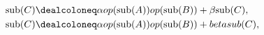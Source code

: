 \documentclass{article}
\begin{document}
\begin{align*} \mathrm{sub}(C) &\dealcoloneq \alpha op(\mathrm{sub}(A))op(\mathrm{sub}(B)) + \beta \mathrm{sub}(C), \\ \mathrm{sub}(C) &\dealcoloneq \alpha op(\mathrm{sub}(A))op(\mathrm{sub}(B)) + beta sub(C), \end{align*}
\pagebreak
\end{document}
